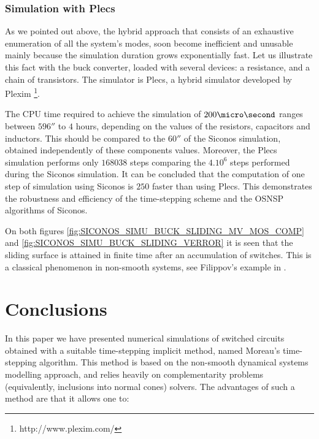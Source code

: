 \subsubsection{Simulation with {\sc Plecs}}

As we pointed out above, the hybrid approach that consists of an exhaustive enumeration of all the
system's modes, soon become inefficient and unusable mainly because the simulation duration grows
exponentially fast. Let us illustrate this fact with the buck converter, loaded with several
devices: a resistance, and a chain of transistors. The simulator is {\sc Plecs}, a hybrid simulator developed by Plexim \footnote{http://www.plexim.com/}. 

The CPU time required to achieve the simulation of $200 \micro\second$ ranges between $596 \second$ to $4$ hours,
depending on the values of the resistors, capacitors and inductors. This should be compared to the
$60\second$ of the {\sc Siconos} simulation, obtained independently of these components values.
Moreover, the {\sc Plecs} simulation performs only $168038$ steps comparing the $4.10^{6}$ steps performed during the {\sc Siconos}
simulation. It can be concluded that the computation of one step of simulation using {\sc Siconos} is $250$
faster than using {\sc Plecs}. This demonstrates the robustness and efficiency of the time-stepping scheme
and the OSNSP algorithms of {\sc Siconos}.

\begin{remark}
  On both figures \ref{fig:SICONOS_SIMU_BUCK_SLIDING_MV_MOS_COMP} and
  \ref{fig:SICONOS_SIMU_BUCK_SLIDING_VERROR} it is seen that the sliding surface is attained in
  finite time after an accumulation of switches. This is a classical phenomenon in non-smooth
  systems, see Filippov's example in \cite{Acary.Brogliato2009}.
\end{remark}
\section{Conclusions}
\label{section5}


In this paper we have presented numerical simulations of switched circuits obtained with a suitable time-stepping implicit method, named Moreau's time-stepping algorithm. This method is based on the non-smooth dynamical systems modelling approach, and relies heavily on complementarity problems (equivalently, inclusions into normal cones) solvers. The advantages of such a method are that it allows one to:

